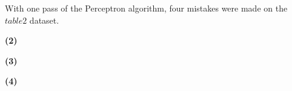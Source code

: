 \documentclass[11pt]{article}
\renewcommand\part[1]{\vspace{.10in}\textbf{(#1)}}
\begin{document}
With one pass of the Perceptron algorithm, four mistakes were made on the $table2$ dataset.



\part{2}

\part{3}

\part{4}
\end{document}
